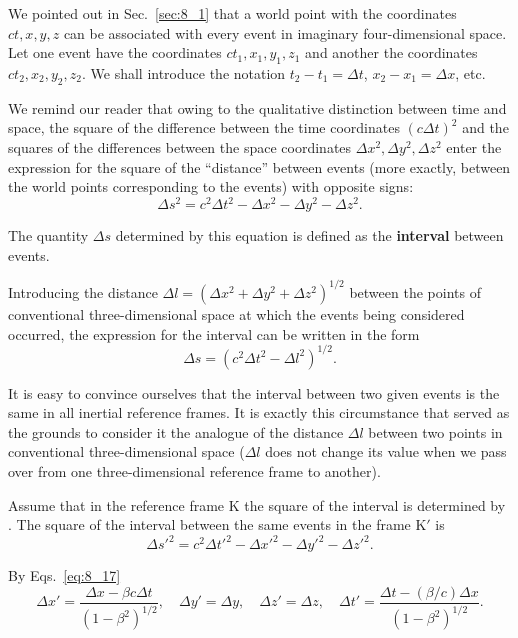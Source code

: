 We pointed out in Sec.~\ref{sec:8_1} that a world point with the coordinates $ct, x, y, z$ can be associated with every event in imaginary four-dimensional space. Let one event have the coordinates $ct_1, x_1, y_1, z_1$ and another the coordinates $ct_2, x_2, y_2, z_2$. We shall introduce the notation $t_2-t_1=\Delta t$, $x_2-x_1=\Delta x$, etc.

We remind our reader that owing to the qualitative distinction between time and space, the square of the difference between the time coordinates $(c\Delta t)^2$ and the squares of the differences between the space coordinates $\Delta x^2, \Delta y^2, \Delta z^2$ enter the expression for the square of the ``distance'' between events (more exactly, between the world points corresponding to the events) with opposite signs:
\begin{equation}\label{eq:8_22}
	\Delta s^2 = c^2\Delta t^2 - \Delta x^2 - \Delta y^2 - \Delta z^2.
\end{equation}

\noindent
The quantity $\Delta s$ determined by this equation is defined as the \textbf{interval} between events.

Introducing the distance $\Delta l=\left(\Delta x^2+\Delta y^2+\Delta z^2\right)^{1/2}$ between the points of conventional three-dimensional space at which the events being considered occurred, the expression for the interval can be written in the form
\begin{equation}\label{eq:8_23}
	\Delta s = \left(c^2\Delta t^2 - \Delta l^2\right)^{1/2}.
\end{equation}

It is easy to convince ourselves that the interval between two given events is the same in all inertial reference frames. It is exactly this circumstance that served as the grounds to consider it the analogue of the distance $\Delta l$ between two points in conventional three-dimensional space ($\Delta l$ does not change its value when we pass over from one three-dimensional reference frame to another).

Assume that in the reference frame K the square of the interval is determined by . The square of the interval between the same events in the frame K$'$ is
\begin{equation}\label{eq:8_24}
	\Delta s'^2 = c^2\Delta t'^2 - \Delta x'^2 - \Delta y'^2 - \Delta z'^2.
\end{equation}

\noindent
By Eqs.~\eqref{eq:8_17}
\begin{equation*}
	\Delta x' = \frac{\Delta x - \beta c\Delta t}{\left(1 - \beta^2\right)^{1/2}},\quad \Delta y' = \Delta y,\quad \Delta z' = \Delta z,\quad 	\Delta t' = \frac{\Delta t - (\beta/c)\Delta x}{\left(1 - \beta^2\right)^{1/2}}.
\end{equation*}

